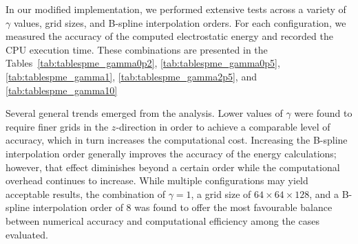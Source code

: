 In our modified implementation, we performed extensive tests across a variety of $\gamma$ values, grid sizes, and B-spline interpolation orders. For each configuration, we measured the accuracy of the computed electrostatic energy and recorded the CPU execution time. These combinations are presented in the Tables~\ref{tab:tablespme_gamma0p2}, \ref{tab:tablespme_gamma0p5}, \ref{tab:tablespme_gamma1}, \ref{tab:tablespme_gamma2p5}, and \ref{tab:tablespme_gamma10}








Several general trends emerged from the analysis. Lower values of $\gamma$ were found to require finer grids in the $ z$-direction in order to achieve a comparable level of accuracy, which in turn increases the computational cost. Increasing the B-spline interpolation order generally improves the accuracy of the energy calculations; however, that effect diminishes beyond a certain order while the computational overhead continues to increase. While multiple configurations may yield acceptable results, the combination of $\gamma = 1$, a grid size of $64 \times 64 \times 128$, and a B-spline interpolation order of 8 was found to offer the most favourable balance between numerical accuracy and computational efficiency among the cases evaluated.

